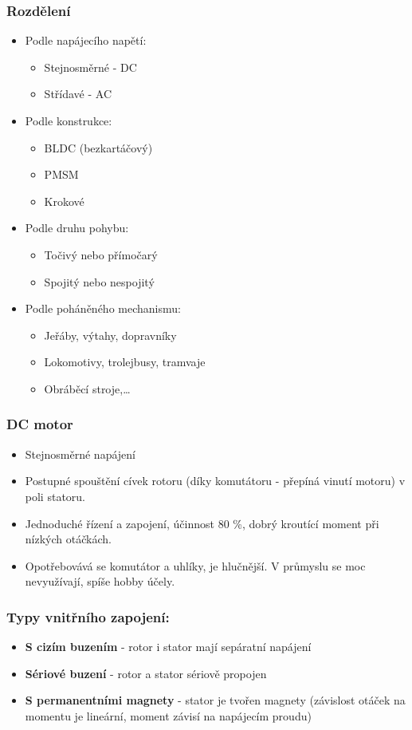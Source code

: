 \subsubsection*{Rozdělení}
\begin{itemize}
  \item Podle napájecího napětí: \begin{itemize}
    \item Stejnosměrné - DC
    \item Střídavé - AC 
  \end{itemize}
  \item Podle konstrukce: \begin{itemize}
    \item BLDC (bezkartáčový)
    \item PMSM 
    \item Krokové
  \end{itemize}
  \item Podle druhu pohybu: \begin{itemize}
    \item Točivý nebo přímočarý
    \item Spojitý nebo nespojitý
  \end{itemize}
  \item Podle poháněného mechanismu: \begin{itemize}
    \item Jeřáby, výtahy, dopravníky
    \item Lokomotivy, trolejbusy, tramvaje
    \item Obráběcí stroje,\dots
  \end{itemize}
\end{itemize}

\subsubsection*{DC motor}
\begin{itemize}
  \item Stejnosměrné napájení
  \item Postupné spouštění cívek rotoru (díky komutátoru - přepíná vinutí motoru) v poli statoru.
  \item Jednoduché řízení a zapojení, účinnost 80 \%, dobrý kroutící moment při nízkých otáčkách.
  \item Opotřebovává se komutátor a uhlíky, je hlučnější. V průmyslu se moc nevyužívají, spíše hobby účely.
\end{itemize}

\subsubsection*{Typy vnitřního zapojení:}
\begin{itemize}
  \item \textbf{S cizím buzením} - rotor i stator mají sepáratní napájení
  \item \textbf{Sériové buzení} - rotor a stator sériově propojen
  \item \textbf{S permanentními magnety} - stator je tvořen magnety (závislost otáček na momentu je lineární, moment závisí na napájecím proudu)
\end{itemize}

